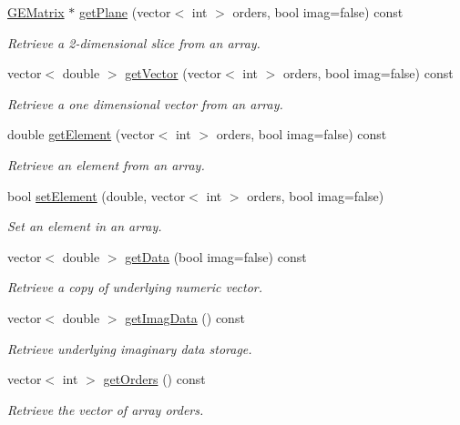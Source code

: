 \begin{DoxyCompactItemize}
\item 
\hyperlink{class_g_e_matrix}{G\-E\-Matrix} $\ast$ \hyperlink{class_g_e_array_a760dc4efc92eb480a6892fe0336a5c13}{get\-Plane} (vector$<$ int $>$ orders, bool imag=false) const 
\begin{DoxyCompactList}\small\item\em Retrieve a 2-\/dimensional slice from an array. \end{DoxyCompactList}\item 
vector$<$ double $>$ \hyperlink{class_g_e_array_a157c2c5a9a96ba4d70873a502439c142}{get\-Vector} (vector$<$ int $>$ orders, bool imag=false) const 
\begin{DoxyCompactList}\small\item\em Retrieve a one dimensional vector from an array. \end{DoxyCompactList}\item 
double \hyperlink{class_g_e_array_a3eb9ae37593f93cd912242e34d864a7b}{get\-Element} (vector$<$ int $>$ orders, bool imag=false) const 
\begin{DoxyCompactList}\small\item\em Retrieve an element from an array. \end{DoxyCompactList}\item 
bool \hyperlink{class_g_e_array_a0e89787df523a69a1834c89adcfdfc3f}{set\-Element} (double, vector$<$ int $>$ orders, bool imag=false)
\begin{DoxyCompactList}\small\item\em Set an element in an array. \end{DoxyCompactList}\item 
vector$<$ double $>$ \hyperlink{class_g_e_array_a213163c7bc79ff072d3fe0de53afcdbe}{get\-Data} (bool imag=false) const 
\begin{DoxyCompactList}\small\item\em Retrieve a copy of underlying numeric vector. \end{DoxyCompactList}\item 
vector$<$ double $>$ \hyperlink{class_g_e_array_a88801ecb7d0845932a5df91e0d87f512}{get\-Imag\-Data} () const 
\begin{DoxyCompactList}\small\item\em Retrieve underlying imaginary data storage. \end{DoxyCompactList}\item 
vector$<$ int $>$ \hyperlink{class_g_e_array_aefb8352fe78692588d285be165267498}{get\-Orders} () const 
\begin{DoxyCompactList}\small\item\em Retrieve the vector of array orders. \end{DoxyCompactList}\item 

\end{DoxyCompactItemize}
